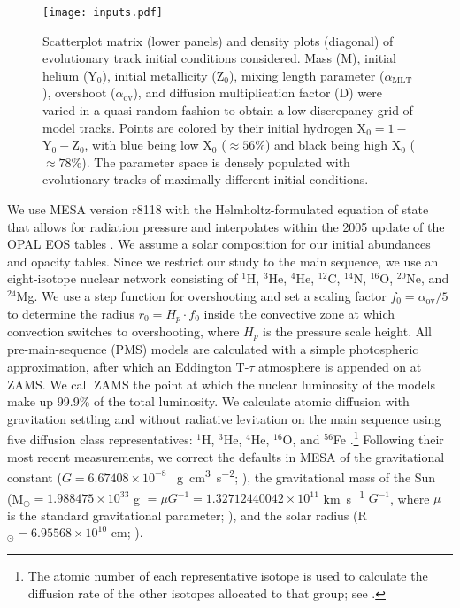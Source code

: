 \documentclass[manuscript,linenumbers]{aastex6}
\begin{document}
\begin{figure*}
    \centering
    \texttt{[image: inputs.pdf]}
    \caption{Scatterplot matrix (lower panels) and density plots (diagonal) of evolutionary track initial conditions considered. Mass (M), initial helium (Y$_0$), initial metallicity (Z$_0$), mixing length parameter ($\alpha_{\text{MLT}}$), overshoot ($\alpha_{\text{ov}}$), and diffusion multiplication factor (D) were varied in a quasi-random fashion to obtain a low-discrepancy grid of model tracks. Points are colored by their initial hydrogen X$_0=1-$Y$_0-$Z$_0$, with blue being low X$_0$ ($\approx 56\%$) and black being high X$_0$ ($\approx 78\%$). The parameter space is densely populated with evolutionary tracks of maximally different initial conditions. }
    \label{fig:inputs}
\end{figure*}

We use MESA version r8118 with the Helmholtz-formulated equation of state that allows for radiation pressure and interpolates within the 2005 update of the OPAL EOS tables \citep{2002ApJ...576.1064R}. We assume a \citet{1998SSRv...85..161G} solar composition for our initial abundances and opacity tables. Since we restrict our study to the main sequence, we use an eight-isotope nuclear network consisting of $^1$H, $^3$He, $^4$He, $^{12}$C, $^{14}$N, $^{16}$O, $^{20}$Ne, and $^{24}$Mg. We use a step function for overshooting and set a scaling factor $f_0 = \alpha_{\text{ov}}/5$ to determine the radius $r_0 = H_p \cdot f_0$ inside the convective zone at which convection switches to overshooting, where $H_p$ is the pressure scale height. %
All pre-main-sequence (PMS) models are calculated with a simple photospheric approximation, after which an Eddington T-$\tau$ atmosphere is appended on at ZAMS. We call ZAMS the point at which the nuclear luminosity of the models make up 99.9\% of the total luminosity. We calculate atomic diffusion with gravitation settling and without radiative levitation on the main sequence using five diffusion class representatives: $^1$H, $^3$He, $^4$He, $^{16}$O, and $^{56}$Fe \citep{burgers1969flow}.\footnote{The atomic number of each representative isotope is used to calculate the diffusion rate of the other isotopes allocated to that group; see \citet{Paxton2011}.} 
Following their most recent measurements, we correct the defaults in MESA of the gravitational constant ($G=6.67408\times 10^{-8}$ \si{\per\g\cm\cubed\per\square\s}; \citealt{2015arXiv150707956M}), the gravitational mass of the Sun (M$_\odot = 1.988475\times 10^{33}$ \si{\g} $= \mu G^{-1} = 1.32712440042\times 10^{11}$ \si{\km\per\s} $G^{-1}$, where $\mu$ is the standard gravitational parameter; \citealt{pitjeva2015determination}), and the solar radius (R$_\odot = 6.95568\times 10^{10}$ \si{\cm}; \citealt{2008ApJ...675L..53H}). 
\end{document}
